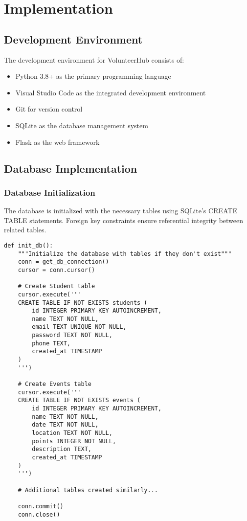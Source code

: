 \documentclass[12pt,a4paper]{report}
\begin{document}
\chapter{Implementation}

\section{Development Environment}
The development environment for VolunteerHub consists of:

\begin{itemize}
    \item Python 3.8+ as the primary programming language
    \item Visual Studio Code as the integrated development environment
    \item Git for version control
    \item SQLite as the database management system
    \item Flask as the web framework
\end{itemize}

\section{Database Implementation}

\subsection{Database Initialization}
The database is initialized with the necessary tables using SQLite's CREATE TABLE statements. Foreign key constraints ensure referential integrity between related tables.

\begin{lstlisting}[caption={Database Initialization Code}, label={lst:db-init}]
def init_db():
    """Initialize the database with tables if they don't exist"""
    conn = get_db_connection()
    cursor = conn.cursor()
    
    # Create Student table
    cursor.execute('''
    CREATE TABLE IF NOT EXISTS students (
        id INTEGER PRIMARY KEY AUTOINCREMENT,
        name TEXT NOT NULL,
        email TEXT UNIQUE NOT NULL,
        password TEXT NOT NULL,
        phone TEXT,
        created_at TIMESTAMP
    )
    ''')
    
    # Create Events table
    cursor.execute('''
    CREATE TABLE IF NOT EXISTS events (
        id INTEGER PRIMARY KEY AUTOINCREMENT,
        name TEXT NOT NULL,
        date TEXT NOT NULL,
        location TEXT NOT NULL,
        points INTEGER NOT NULL,
        description TEXT,
        created_at TIMESTAMP
    )
    ''')
    
    # Additional tables created similarly...
    
    conn.commit()
    conn.close()
\end{lstlisting}
\end{document}
